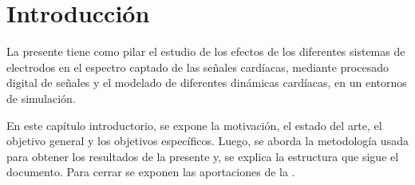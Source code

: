 
\chapter{Introducción}

\begin{resumen}
La presente \nombreDoc tiene como pilar el estudio de los efectos de los
diferentes sistemas de electrodos en el espectro captado de las señales cardíacas, mediante procesado digital de señales y el modelado de diferentes dinámicas cardíacas, en un entornos de simulación.

En este capítulo introductorio, se expone la motivación, el estado del arte, el
objetivo general y los objetivos específicos. Luego, se
aborda la metodología usada para obtener los resultados de la
presente \nombreDoc y, se explica la estructura que sigue el
documento. Para cerrar se exponen las aportaciones de la \nombreDoc.



\end{resumen}


\medskip %





